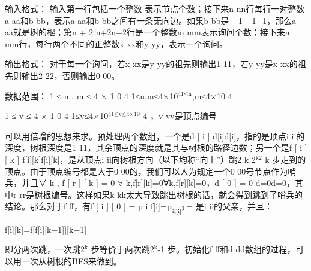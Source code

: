 \documentclass[9pt, b5paaper]{book}
\begin{document}
输入格式：
输入第一行包括一个整数 表示节点个数；接下来n nn行每行一对整数a aa和b bb，表示a aa和b bb之间有一条无向边。如果b bb是− 1 −1−1，那么a aa就是树的根；第n + 2 n+2n+2行是一个整数m mm表示询问个数；接下来m mm行，每行两个不同的正整数x xx和y yy，表示一个询问。

输出格式：
对于每一个询问，若x xx是y yy的祖先则输出1 11，若y yy是x xx的祖先则输出2 22，否则输出0 00。

数据范围：
1 ≤ n , m ≤ 4 × 1 0 4 1≤n,m≤4×10$^{\text{41≤n}}$,m≤4×10 
4

1 ≤ v ≤ 4 × 1 0 4 1≤v≤4×10$^{\text{41≤v≤4×10}}$ 
4
 ，v vv是顶点编号

可以用倍增的思想来求。预处理两个数组，一个是d [ i ] d[i]d[i]，指的是顶点i ii的深度，树根深度是1 11，其余顶点的深度就是其与树根的路径边数；另一个是f [ i ] [ k ] f[i][k]f[i][k]，是从顶点i ii向树根方向（以下均称“向上”）跳2 k 2$^{\text{k2}}$ 
k
 步走到的顶点。由于顶点编号都是大于0 00的，我们可以人为规定一个0 00号节点作为哨兵，并且∀ k , f [ r ] [ k ] = 0 $\forall$ k,f[r][k]=0∀k,f[r][k]=0，d [ 0 ] = 0 d\footnotemark[1]{}=0d\footnotemark[1]{}=0，其中r rr是树根编号。这样如果k kk太大导致跳出树根的话，就会得到跳到了哨兵的结论。那么对于f ff，有f [ i ] [ 0 ] = p i f[i]\footnotemark[1]{}=p$_{\text{if[i]}\footnotemark[1]{}}$= 是i ii的父亲，并且：

f[i][k]=f[f[i][k−1]][k−1]

即分两次跳，一次跳2$^{\text{k}}$ 步等价于两次跳2$^{\text{k}}$-1 步。初始化f ff和d dd数组的过程，可以用一次从树根的BFS来做到。
\end{document}
